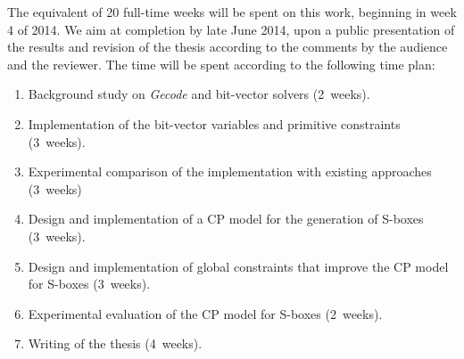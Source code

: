 \documentclass[a4paper,11pt]{article}
\newcommand{\Gecode}{\textit{Gecode}}
\begin{document}
The equivalent of 20 full-time weeks will be spent on
this work, beginning in week 4 of 2014.
We aim at completion by late June 2014, upon a public presentation of
the results and revision of the thesis according to the comments by
the audience and the reviewer.  The time will be spent according to
the following time plan:
\begin{enumerate}
\item Background study on \Gecode{} and bit-vector solvers (2~weeks).
\item Implementation of the bit-vector variables and primitive
  constraints (3~weeks).
\item Experimental comparison of the implementation with existing
  approaches (3~weeks)
\item Design and implementation of a CP model for the generation of
  S-boxes (3~weeks).
\item Design and implementation of global constraints that improve the CP model for S-boxes (3~weeks).
\item Experimental evaluation of the CP model for S-boxes (2~weeks).
\item Writing of the thesis (4~weeks).
\end{enumerate}



\end{document}
